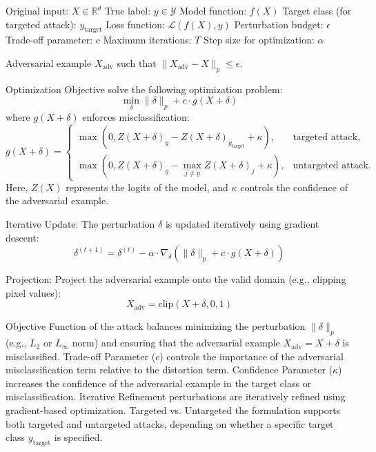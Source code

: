 
Original input: $X \in \mathbb{R}^d$
True label: $y \in \mathcal{Y}$
Model function: $f(X)$
Target class (for targeted attack): $y_{\text{target}}$
Loss function: $\mathcal{L}(f(X), y)$
Perturbation budget: $\epsilon$
Trade-off parameter: $c$
Maximum iterations: $T$
Step size for optimization: $\alpha$

Adversarial example $X_{\text{adv}}$ such that $\|X_{\text{adv}} - X\|_p \leq \epsilon$.

Optimization Objective solve the following optimization problem:
    \[
    \min_{\delta} \|\delta\|_p + c \cdot g(X + \delta)
    \]
    where $g(X + \delta)$ enforces misclassification:
    \[
    g(X + \delta) = 
    \begin{cases} 
    \max(0, Z(X + \delta)_y - Z(X + \delta)_{y_{\text{target}}} + \kappa), & \text{targeted attack}, \\
    \max(0, Z(X + \delta)_y - \max_{j \neq y} Z(X + \delta)_j + \kappa), & \text{untargeted attack}.
    \end{cases}
    \]
    Here, $Z(X)$ represents the logits of the model, and $\kappa$ controls the confidence of the adversarial example.

Iterative Update: The perturbation $\delta$ is updated iteratively using gradient descent:
    \[
    \delta^{(t+1)} = \delta^{(t)} - \alpha \cdot \nabla_\delta \left( \|\delta\|_p + c \cdot g(X + \delta) \right)
    \]

Projection: Project the adversarial example onto the valid domain (e.g., clipping pixel values):
    \[
    X_{\text{adv}} = \text{clip}(X + \delta, 0, 1)
    \]

Objective Function of the attack balances minimizing the perturbation $\|\delta\|_p$ (e.g., $L_2$ or $L_\infty$ norm) and ensuring that the adversarial example $X_{\text{adv}} = X + \delta$ is misclassified. Trade-off Parameter ($c$) controls the importance of the adversarial misclassification term relative to the distortion term. Confidence Parameter ($\kappa$) increases the confidence of the adversarial example in the target class or misclassification. Iterative Refinement perturbations are iteratively refined using gradient-based optimization. Targeted vs. Untargeted the formulation supports both targeted and untargeted attacks, depending on whether a specific target class $y_{\text{target}}$ is specified.